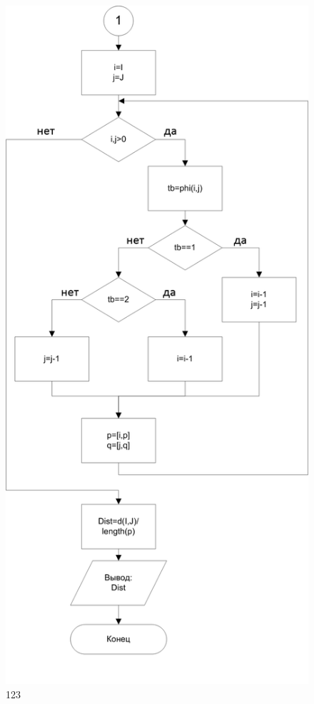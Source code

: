 \documentclass[a4paper,14pt,russian,utf8,nocolumnsxix,nocolumnxxxi,nocolumnxxxii]{eskdtext}
\begin{document}
\begin{figure}[htb]
\ContinuedFloat
\begin{center}
\includegraphics[width=120mm]{block2.png}
\end{center}
\caption[]{123}
\end{figure}
\clearpage
\end{document}
